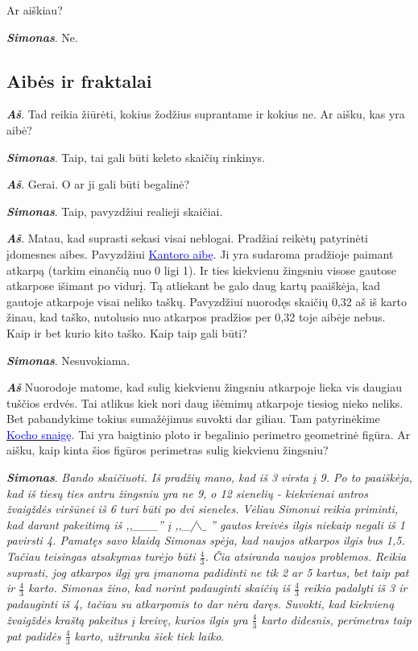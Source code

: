 \documentclass[a4paper]{article}
\newcommand{\goto}[2]{\href{\detokenize{#1}}{\textcolor{blue}{#2}}}
\newcommand{\say}[1]{\textbf{\textit{#1}}}
\begin{document}
Ar aiškiau?

\say{Simonas}. Ne.

\subsection*{Aibės ir fraktalai}
\say{Aš}. Tad reikia žiūrėti, kokius žodžius suprantame ir kokius ne. Ar aišku, kas yra aibė?

\say{Simonas}. Taip, tai gali būti keleto skaičių rinkinys.

\say{Aš}. Gerai. O ar ji gali būti begalinė?

\say{Simonas}. Taip, pavyzdžiui realieji skaičiai.

\say{Aš}. Matau, kad suprasti sekasi visai neblogai. Pradžiai reikėtų patyrinėti įdomesnes aibes. Pavyzdžiui \goto{https://en.wikipedia.org/wiki/Cantor_set}{Kantoro aibę}. Ji yra sudaroma pradžioje paimant atkarpą (tarkim einančią nuo 0 ligi 1). Ir ties kiekvienu žingsniu visose gautose atkarpose išimant po vidurį. Tą atliekant be galo daug kartų paaiškėja, kad gautoje atkarpoje visai neliko taškų. Pavyzdžiui nuorodęs skaičių 0,32 aš iš karto žinau, kad taško, nutolusio nuo atkarpos pradžios per 0,32 toje aibėje nebus. Kaip ir bet kurio kito taško. Kaip taip gali būti?

\say{Simonas}. Nesuvokiama. 

\say{Aš} Nuorodoje matome, kad sulig kiekvienu žingsniu atkarpoje lieka vis daugiau tuščios erdvės. Tai atlikus kiek nori daug išėmimų atkarpoje tiesiog nieko neliks. Bet pabandykime tokius sumažėjimus suvokti dar giliau. Tam patyrinėkime \goto{https://en.wikipedia.org/wiki/Koch_snowflake}{Kocho snaigę}. Tai yra baigtinio ploto ir begalinio perimetro geometrinė figūra. Ar aišku, kaip kinta šios figūros perimetras sulig kiekvienu žingsniu?

\say{Simonas}. \textit{Bando skaičiuoti. Iš pradžių mano, kad iš 3 virsta į 9. Po to paaiškėja, kad iš tiesų ties antru žingsniu yra ne 9, o 12 sienelių - kiekvienai antros žvaigždės viršūnei iš 6 turi būti po dvi sieneles. Vėliau Simonui reikia priminti, kad darant pakeitimą iš ,,\_\_\_'' į ,,\_/$\backslash\_$ '' gautos kreivės ilgis niekaip negali iš 1 pavirsti 4. Pamatęs savo klaidą Simonas spėja, kad naujos atkarpos ilgis bus 1,5. Tačiau teisingas atsakymas turėjo būti $\frac{4}{3}$. Čia atsiranda naujos problemos. Reikia suprasti, jog atkarpos ilgį yra įmanoma padidinti ne tik 2 ar 5 kartus, bet taip pat ir $\frac{4}{3}$ karto. Simonas žino, kad norint padauginti skaičių iš $\frac{4}{3}$ reikia padalyti iš 3 ir padauginti iš 4, tačiau su atkarpomis to dar nėra daręs. Suvokti, kad kiekvieną žvaigždės kraštą pakeitus į kreivę, kurios ilgis yra $\frac{4}{3}$ karto didesnis, perimetras taip pat padidės $\frac{4}{3}$ karto, užtrunka šiek tiek laiko}.
\end{document}
